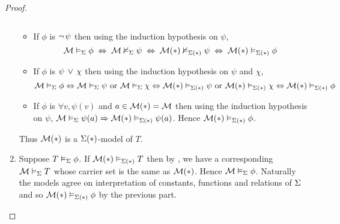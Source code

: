 \begin{proof}
\begin{enumerate}
\begin{itemize}
\[                \]
            \item If $\phi$ is $\neg\, \psi$ 
                then using the induction hypothesis on $\psi$,
                \[
                    \mathcal{M} \vDash_{\Sigma} \phi \; \Leftrightarrow \;
                    \mathcal{M} \nvDash_{\Sigma} \psi \; \Leftrightarrow \;
                    \mathcal{M}(*) \nvDash_{\Sigma(*)} \psi \; \Leftrightarrow \;
                    \mathcal{M}(*) \vDash_{\Sigma(*)} \phi
                \]
            \item If $\phi$ is $\psi \, \lor \, \chi$
                then using the induction hypothesis on $\psi$ and $\chi$,
                \[
                    \mathcal{M} \vDash_{\Sigma} \phi \Leftrightarrow 
                    \mathcal{M} \vDash_{\Sigma} \psi \text{ or } \mathcal{M} \vDash_{\Sigma} \chi 
                    \Leftrightarrow \mathcal{M}(*) \vDash_{\Sigma(*)} \psi \text{ or } 
                    \mathcal{M}(*) \vDash_{\Sigma(*)} \chi 
                    \Leftrightarrow \mathcal{M}(*) \vDash_{\Sigma(*)} \phi
                \]
            \item If $\phi$ is $\forall v, \psi(v)$ and 
                $a \in {\mathcal{M}(*)} = {\mathcal{M}}$
                then using the induction hypothesis on $\psi$,
                $\mathcal{M} \vDash_{\Sigma} \psi(a) \Rightarrow \mathcal{M}(*) \vDash_{\Sigma(*)} \psi(a)$.
                Hence $\mathcal{M}(*) \vDash_{\Sigma(*)} \phi$.
        \end{itemize}
        Thus $\mathcal{M}(*)$ is a $\Sigma(*)$-model of $T$.

        \item Suppose $T \vDash_{\Sigma} \phi$.
        If $\mathcal{M}(*) \vDash_{\Sigma(*)} T$ then by 
        ,
        we have a corresponding $\mathcal{M} \vDash_{\Sigma} T$ 
        whose carrier set is the same as $\mathcal{M}(*)$.
        Hence $\mathcal{M} \vDash_{\Sigma} \phi$.
        Naturally the models agree on interpretation
        of constants, functions and relations of $\Sigma$ and so 
        $\mathcal{M}(*) \vDash_{\Sigma(*)} \phi$ by the previous part.
    \end{enumerate}
\end{proof}

